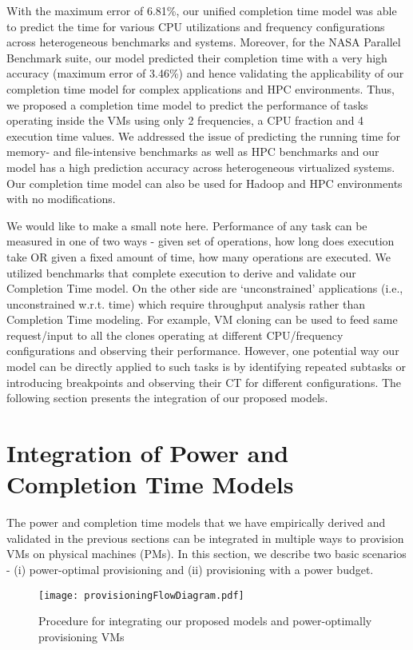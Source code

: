 \documentclass{sig-alternate}
\begin{document}
With the maximum error of 6.81\%, our unified completion time model was able to predict the time for various CPU utilizations and frequency configurations across heterogeneous benchmarks and systems. Moreover, for the NASA Parallel Benchmark suite, our model predicted their completion time with a very high accuracy (maximum error of 3.46\%) and hence validating the applicability of our completion time model for complex applications and HPC environments. Thus, we proposed a completion time model to predict the performance of tasks operating inside the VMs using only 2 frequencies, a CPU fraction and 4 execution time values. We addressed the issue of predicting the running time for memory- and file-intensive benchmarks as well as HPC benchmarks and our model has a high prediction accuracy across heterogeneous virtualized systems. Our completion time model can also be used for Hadoop and HPC environments with no modifications. 

We would like to make a small note here. Performance of any task can be measured in one of two ways - given set of operations, how long does execution take OR given a fixed amount of time, how many operations are executed. We utilized benchmarks that complete execution to derive and validate our Completion Time model. On the other side are `unconstrained' applications (i.e., unconstrained w.r.t. time) which require throughput analysis rather than Completion Time modeling. For example, VM cloning \cite{SnowFlock} can be used to feed same request/input to all the clones operating at different CPU/frequency configurations and observing their performance. However, one potential way our model can be directly applied to such tasks is by identifying repeated subtasks or introducing breakpoints and observing their CT for different configurations. The following section presents the integration of our proposed models.


\section{Integration of Power and Completion Time Models}
\label{sec:integration}

The power and completion time models that we have empirically derived and validated in the previous sections can be integrated in multiple ways to provision VMs on physical machines (PMs). In this section, we describe two basic scenarios - (i) power-optimal provisioning and (ii) provisioning with a power budget.

\begin{figure}[!htbp]
\centering
\vspace{-0.3cm}
\texttt{[image: provisioningFlowDiagram.pdf]}
\caption{Procedure for integrating our proposed models and power-optimally provisioning VMs}
\label{fig:provisioningFlowDiagram}
 \vspace{-0.5cm}
\end{figure}
\end{document}
